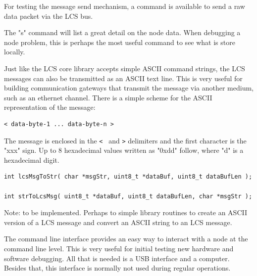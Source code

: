 

For testing the message send mechanism, a command is available to send a raw data packet via the LCS bus.



The "s" command will list a great detail on the node data. When debugging a node problem, this is perhaps the most useful command to see what is store locally.




Just like the LCS core library accepts simple ASCII command strings, the LCS messages can also be transmitted as an ASCII text line. This is very useful for building communication gateways that transmit the message via another medium, such as an ethernet channel. There is a simple scheme for the ASCII representation of the message:

\lstset{style=codesnippetstyle}
\begin{lstlisting}
< data-byte-1 ... data-byte-n >
\end{lstlisting}


The message is enclosed in the \texttt{<}  and \texttt{>} delimiters and the first character is the "xxx" sign. Up to 8 hexadecimal values written as "0xdd" follow, where "d" is a hexadecimal digit.

\lstset{style=codesnippetstyle}
\begin{lstlisting}
int lcsMsgToStr( char *msgStr, uint8_t *dataBuf, uint8_t dataBufLen );

int strToLcsMsg( uint8_t *dataBuf, uint8_t dataBufLen, char *msgStr );
\end{lstlisting}




Note: to be implemented. Perhaps to simple library routines to create an ASCII version of a LCS message and convert an ASCII string to an LCS message.


The command line interface provides an easy way to interact with a node at the command line level. This is very useful for initial testing new hardware and software debugging. All that is needed is a USB interface and a computer. Besides that, this interface is normally not used during regular operations.